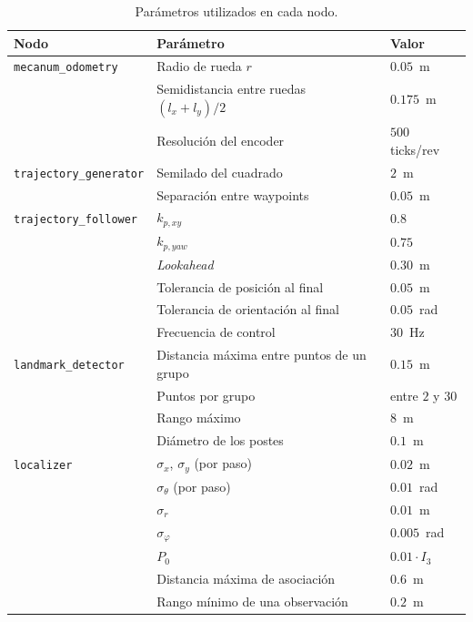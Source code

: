 \documentclass[11pt,a4paper]{article}
\begin{document}
\begin{table}[!htbp]
\centering
\small
\begin{tabular}{lll}
\toprule
\textbf{Nodo} & \textbf{Parámetro} & \textbf{Valor} \\
\midrule
\texttt{mecanum\_odometry} & Radio de rueda $r$ & $0.05$~m \\
 & Semidistancia entre ruedas $(l_x + l_y)/2$ & $0.175$~m \\
 & Resolución del encoder & $500$ ticks/rev \\
\midrule
\texttt{trajectory\_generator} & Semilado del cuadrado & $2$~m \\
 & Separación entre waypoints & $0.05$~m \\
\midrule
\texttt{trajectory\_follower} & $k_{p,xy}$ & $0.8$ \\
 & $k_{p,yaw}$ & $0.75$ \\
 & \emph{Lookahead} & $0.30$~m \\
 & Tolerancia de posición al final & $0.05$~m \\
 & Tolerancia de orientación al final & $0.05$~rad \\
 & Frecuencia de control & $30$~Hz \\
\midrule
\texttt{landmark\_detector} & Distancia máxima entre puntos de un grupo & $0.15$~m \\
 & Puntos por grupo & entre $2$ y $30$ \\
 & Rango máximo & $8$~m \\
 & Diámetro de los postes & $0.1$~m \\
\midrule
\texttt{localizer} & $\sigma_x$, $\sigma_y$ (por paso) & $0.02$~m \\
 & $\sigma_\theta$ (por paso) & $0.01$~rad \\
 & $\sigma_r$ & $0.01$~m \\
 & $\sigma_\varphi$ & $0.005$~rad \\
 & $P_0$ & $0.01 \cdot I_3$ \\
 & Distancia máxima de asociación & $0.6$~m \\
 & Rango mínimo de una observación & $0.2$~m \\
\bottomrule
\end{tabular}
\caption{Parámetros utilizados en cada nodo.}
\label{tab:anexo}
\end{table}
\end{document}
